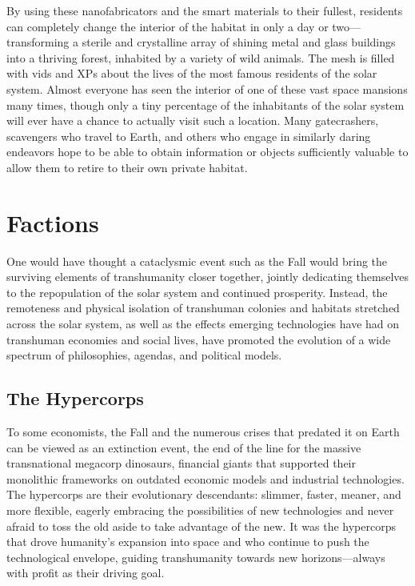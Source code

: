 By using these nanofabricators and the smart materials to their fullest, residents can completely change 
the interior of the habitat in only a day or two—transforming a sterile and crystalline array of shining metal 
and glass buildings into a thriving forest, inhabited by 
a variety of wild animals. The mesh is filled with vids 
and XPs about the lives of the most famous residents 
of the solar system. Almost everyone has seen the interior of one of these vast space mansions many times, 
though only a tiny percentage of the inhabitants of 
the solar system will ever have a chance to actually 
visit such a location. Many gatecrashers, scavengers 
who travel to Earth, and others who engage in similarly daring endeavors hope to be able to obtain information or objects sufficiently valuable to allow them 
to retire to their own private habitat.

\section{Factions}

One would have thought a cataclysmic event such 
as the Fall would bring the surviving elements of 
transhumanity closer together, jointly dedicating 
themselves to the repopulation of the solar system 
and continued prosperity. Instead, the remoteness and 
physical isolation of transhuman colonies and habitats 
stretched across the solar system, as well as the effects emerging technologies have had on transhuman 
economies and social lives, have promoted the evolution of a wide spectrum of philosophies, agendas, and 
political models.

\subsection{The Hypercorps}

To some economists, the Fall and the numerous crises 
that predated it on Earth can be viewed as an extinction event, the end of the line for the massive transnational megacorp dinosaurs, financial giants that 
supported their monolithic frameworks on outdated 
economic models and industrial technologies. The hypercorps are their evolutionary descendants: slimmer, 
faster, meaner, and more flexible, eagerly embracing 
the possibilities of new technologies and never afraid 
to toss the old aside to take advantage of the new. It 
was the hypercorps that drove humanity's expansion 
into space and who continue to push the technological 
envelope, guiding transhumanity towards new horizons—always with profit as their driving goal.

